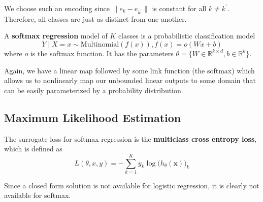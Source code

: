   We choose such an encoding since $\|e_k - e_{k^\prime}\|$ is constant for all $k \neq k^\prime$. Therefore, all classes are just as distinct from one another. 

  \begin{definition}
    A \textbf{softmax regression} model of $K$ classes is a probabilistic classification model 
    \begin{equation}
      Y \mid X = x \sim \mathrm{Multinomial}(f(x)), f(x) = o(Wx + b)
    \end{equation} 
    where $o$ is the softmax function. It has the parameters $\theta = \{W \in \mathbb{R}^{k \times d}, b \in \mathbb{R}^k\}$. 
  \end{definition}

  Again, we have a linear map followed by some link function (the softmax) which allows us to nonlinearly map our unbounded linear outputs to some domain that can be easily parameterized by a probability distribution. 

\subsection{Maximum Likelihood Estimation} 

  \begin{lemma}
    
  \end{lemma}

  \begin{definition}
    The surrogate loss for softmax regression is the \textbf{multiclass cross entropy loss}, which is defined as 
    \begin{equation}
      L(\theta, x, y) = - \sum_{k=1}^K y_k \log \big( h_\theta (\mathbf{x}) \big)_k
    \end{equation}
  \end{definition}

  Since a closed form solution is not available for logistic regression, it is clearly not available for softmax. 

